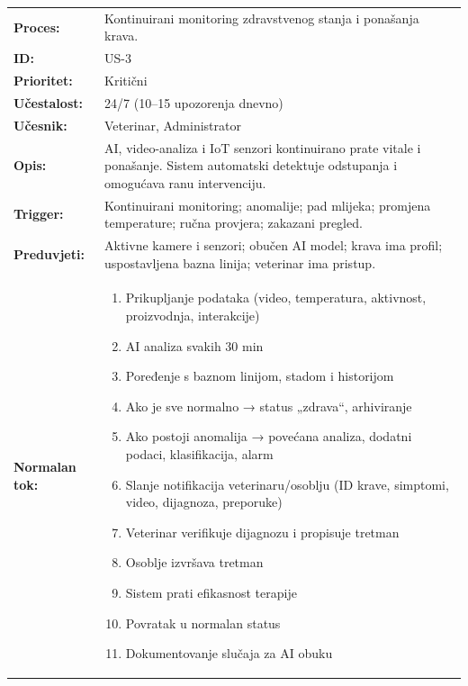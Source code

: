 \documentclass{article}
\begin{document}
\begin{table}[H]
\centering
\small
\begin{tabular}{|p{3.5cm}|p{11cm}|}
\hline
\rowcolor[HTML]{B4C7E7}
\multicolumn{2}{|c|}{\textbf{US-3: Praćenje zdravstvenog stanja}} \\
\hline
\textbf{Proces:} & Kontinuirani monitoring zdravstvenog stanja i ponašanja krava. \\
\hline
\textbf{ID:} & US-3 \\
\hline
\textbf{Prioritet:} & Kritični \\
\hline
\textbf{Učestalost:} & 24/7 (10–15 upozorenja dnevno) \\
\hline
\textbf{Učesnik:} & Veterinar, Administrator \\
\hline
\textbf{Opis:} & AI, video-analiza i IoT senzori kontinuirano prate vitale i ponašanje. Sistem automatski detektuje odstupanja i omogućava ranu intervenciju. \\
\hline
\textbf{Trigger:} & Kontinuirani monitoring; anomalije; pad mlijeka; promjena temperature; ručna provjera; zakazani pregled. \\
\hline
\textbf{Preduvjeti:} & Aktivne kamere i senzori; obučen AI model; krava ima profil; uspostavljena bazna linija; veterinar ima pristup. \\
\hline
\textbf{Normalan tok:} & 
\begin{enumerate}[leftmargin=*, nosep]
    \item Prikupljanje podataka (video, temperatura, aktivnost, proizvodnja, interakcije)
    \item AI analiza svakih 30 min
    \item Poređenje s baznom linijom, stadom i historijom
    \item Ako je sve normalno → status „zdrava“, arhiviranje
    \item Ako postoji anomalija → povećana analiza, dodatni podaci, klasifikacija, alarm
    \item Slanje notifikacija veterinaru/osoblju (ID krave, simptomi, video, dijagnoza, preporuke)
    \item Veterinar verifikuje dijagnozu i propisuje tretman
    \item Osoblje izvršava tretman
    \item Sistem prati efikasnost terapije
    \item Povratak u normalan status
    \item Dokumentovanje slučaja za AI obuku
\end{enumerate} \\

\end{tabular}
\end{table}
\end{document}
